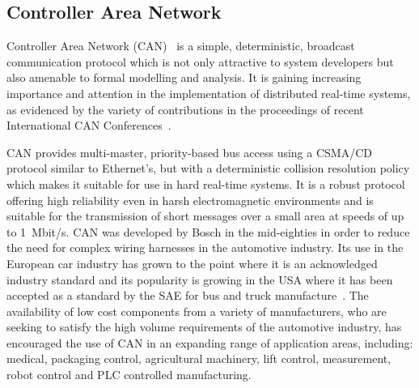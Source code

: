 \subsection{Controller Area Network}
Controller Area Network (CAN)~\cite{bos:91,iso:11898} is a simple,
deterministic, broadcast communication protocol which is not only
attractive to system developers but also amenable to formal modelling
and analysis. It is gaining increasing importance and attention in the
implementation of distributed real-time systems, as evidenced by the
variety of contributions in the proceedings of recent International
CAN Conferences~\cite{cia:99}.

CAN provides multi-master, priority-based bus access using a CSMA/CD
protocol similar to Ethernet's, but with a deterministic collision
resolution policy which makes it suitable for use in hard real-time
systems.  It is a robust protocol offering high reliability even in
harsh electromagnetic environments and is suitable for the
transmission of short messages over a small area at speeds of up to
1~Mbit/s.  CAN was developed by Bosch in the mid-eighties in order to
reduce the need for complex wiring harnesses in the automotive
industry.  Its use in the European car industry has grown to the point
where it is an acknowledged industry standard and its popularity is
growing in the USA where it has been accepted as a standard by the SAE
for bus and truck manufacture~\cite{sae:92}. The availability of low
cost components from a variety of manufacturers, who are seeking to
satisfy the high volume requirements of the automotive industry, has
encouraged the use of CAN in an expanding range of application areas,
including: medical, packaging control, agricultural machinery, lift
control, measurement, robot control and PLC controlled manufacturing.

